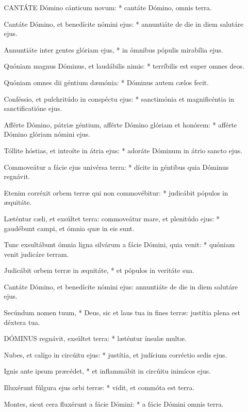 
\lettrine[lines=2]{C}{ANTÁTE} Dómino cánticum novum: * cantáte Dómino, omnis terra.

Cantáte Dómino, et benedícite nómini ejus: * annuntiáte de die in diem salutáre ejus.

Annuntiáte inter gentes glóriam ejus, * in ómnibus pópulis mirabília ejus.

Quóniam magnus Dóminus, et laudábilis nimis: * terríbilis est super omnes deos.

Quóniam omnes dii géntium dæmónia: * Dóminus autem cælos fecit.

Conféssio, et pulchritúdo in conspéctu ejus: * sanctimónia et magnificéntia in sanctificatióne ejus.

Afférte Dómino, pátriæ géntium, afférte Dómino glóriam et honórem: * afférte Dómino glóriam nómini ejus.

Tóllite hóstias, et introíte in átria ejus: * adoráte Dóminum in átrio sancto ejus.

Commoveátur a fácie ejus univérsa terra: * dícite in géntibus quia Dóminus regnávit.

Etenim corréxit orbem terræ qui non commovébitur: * judicábit pópulos in æquitáte.

Læténtur cæli, et exsúltet terra: commoveátur mare, et plenitúdo ejus: * gaudébunt campi, et ómnia quæ in eis sunt.

Tunc exsultábunt ómnia ligna silvárum a fácie Dómini, quia venit: * quóniam venit judicáre terram.

Judicábit orbem terræ in æquitáte, * et pópulos in veritáte sua.

 Cantáte Dómino, et benedícite nómini ejus: annuntiáte de die in diem salutáre ejus.

 Secúndum nomen tuum, * Deus, sic et laus tua in fines terræ: justítia plena est déxtera tua.


\lettrine[lines=2]{D}{ÓMINUS} regnávit, exsúltet terra: * læténtur ínsulæ multæ.

Nubes, et calígo in circúitu ejus: * justítia, et judícium corréctio sedis ejus.

Ignis ante ipsum præcédet, * et inflammábit in circúitu inimícos ejus.

Illuxérunt fúlgura ejus orbi terræ: * vidit, et commóta est terra.

Montes, sicut cera fluxérunt a fácie Dómini: * a fácie Dómini omnis terra.

